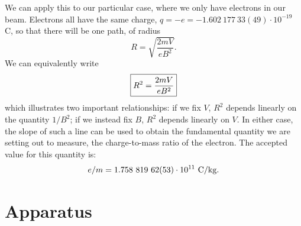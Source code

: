 We can apply this to our particular case, where we only have electrons in our
beam. Electrons all have the same charge, 
$q=-e=-1.602~177~33(49)\cdot 10^{-19}$ C, so that there will be one path, of 
radius 
$$
R=\sqrt{\frac{2mV}{eB^2}}.
$$
We can equivalently write
\begin{equation}
\fbox{$ \displaystyle R^2 = \frac{2mV}{eB^2}$} \label{eq:ed:eoverm}
\end{equation}
which illustrates two important relationships: if we fix $V$, $R^2$ depends 
linearly on the quantity $1/B^2$; if we instead fix $B$, $R^2$ depends linearly
on $V$. In either case, the slope of such a line can be used to obtain the
fundamental quantity we are setting out to measure, the  charge-to-mass ratio of
the electron. The accepted value for this quantity is:
\begin{displaymath}
e/m=1.758~819~62(53)\cdot 10^{11}\rm ~C/kg.
\end{displaymath}

\section{Apparatus}

